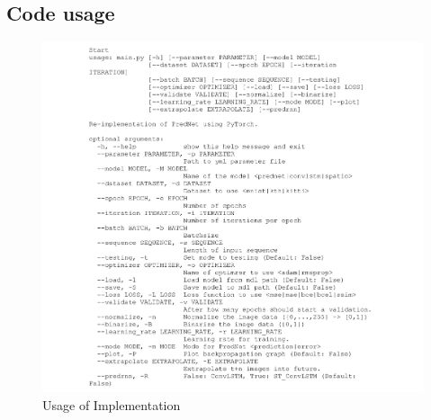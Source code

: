  \subsection*{Code usage}
  \begin{figure}[H]
   \includegraphics[width=1.0\textwidth]{../Images/usage.png}
   \centering
   \caption{Usage of Implementation}
   \label{fig:tree}
  \end{figure}\noindent
 \newpage

